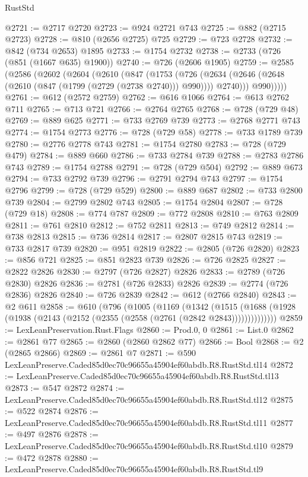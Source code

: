 \begin{lexlean}{RustStd}
\begin{coremodule}
@2721 := @2717 @2720
@2723 := @924 @2721 @743
@2725 := @882 (@2715 @2723)
@2728 := @810 (@2656 @2725) @725
@2729 := @723 @2728
@2732 := @842 (@734 @2653) @1895
@2733 := @1754 @2732
@2738 := @2733 (@726 (@851 (@1667 @635) @1900))
@2740 := @726 (@2606 @1905)
@2759 := @2585
    (@2586
      (@2602
        (@2604
          (@2610
            (@847
              (@1753
                (@726
                  (@2634 (@2646 (@2648 (@2610 (@847 (@1799 (@2729 (@2738 @2740))) @990)))) @2740)))
              @990)))))
@2761 := @612 (@2572 @2759)
@2762 := @616 @1066
@2764 := @613 @2762 @711
@2765 := @713 @721
@2766 := @2764 @2765
@2768 := @728 (@729 @48)
@2769 := @889 @625
@2771 := @733 @2769 @739
@2773 := @2768 @2771 @743
@2774 := @1754 @2773
@2776 := @728 (@729 @58)
@2778 := @733 @1789 @739
@2780 := @2776 @2778 @743
@2781 := @1754 @2780
@2783 := @728 (@729 @479)
@2784 := @889 @660
@2786 := @733 @2784 @739
@2788 := @2783 @2786 @743
@2789 := @1754 @2788
@2791 := @728 (@729 @504)
@2792 := @889 @673
@2794 := @733 @2792 @739
@2796 := @2791 @2794 @743
@2797 := @1754 @2796
@2799 := @728 (@729 @529)
@2800 := @889 @687
@2802 := @733 @2800 @739
@2804 := @2799 @2802 @743
@2805 := @1754 @2804
@2807 := @728 (@729 @18)
@2808 := @774 @787
@2809 := @772 @2808
@2810 := @763 @2809
@2811 := @761 @2810
@2812 := @752 @2811
@2813 := @749 @2812
@2814 := @738 @2813
@2815 := @736 @2814
@2817 := @2807 @2815 @743
@2819 := @733 @2817 @739
@2820 := @951 @2819
@2822 := @2805 (@726 @2820)
@2823 := @856 @721
@2825 := @851 @2823 @739
@2826 := @726 @2825
@2827 := @2822 @2826
@2830 := @2797 (@726 @2827) @2826
@2833 := @2789 (@726 @2830) @2826
@2836 := @2781 (@726 @2833) @2826
@2839 := @2774 (@726 @2836) @2826
@2840 := @726 @2839
@2842 := @612 (@2766 @2840)
@2843 := @2 @611
@2858 := @610
    (@796
      (@1005
        (@1169
          (@1342
            (@1515
              (@1688 (@1928 (@1938 (@2143 (@2152 (@2355 (@2558 (@2761 (@2842 @2843))))))))))))))
@2859 := LexLeanPreservation.Rust.Flags
@2860 := Prod.{0, 0}
@2861 := List.{0}
@2862 := @2861 @77
@2865 := @2860 (@2860 @2862 @77)
@2866 := Bool
@2868 := @2 (@2865 @2866)
@2869 := @2861 @7
@2871 := @590 LexLeanPreserve.Caded85d0ec70c96655a45904ef60abdb.R8.RustStd.tl14
@2872 := LexLeanPreserve.Caded85d0ec70c96655a45904ef60abdb.R8.RustStd.tl13
@2873 := @547 @2872
@2874 := LexLeanPreserve.Caded85d0ec70c96655a45904ef60abdb.R8.RustStd.tl12
@2875 := @522 @2874
@2876 := LexLeanPreserve.Caded85d0ec70c96655a45904ef60abdb.R8.RustStd.tl11
@2877 := @497 @2876
@2878 := LexLeanPreserve.Caded85d0ec70c96655a45904ef60abdb.R8.RustStd.tl10
@2879 := @472 @2878
@2880 := LexLeanPreserve.Caded85d0ec70c96655a45904ef60abdb.R8.RustStd.tl9

\end{coremodule}
\end{lexlean}
